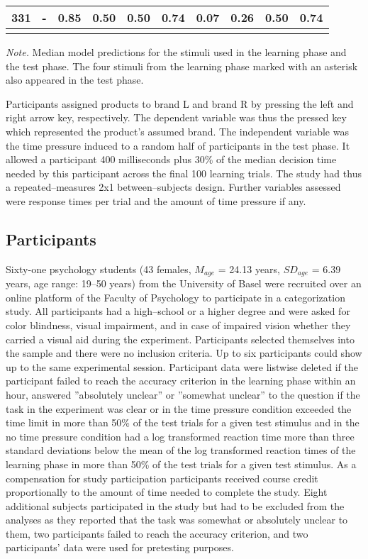 \documentclass[a4paper,man,natbib]{apa6}
\begin{document}
\begin{sidewaystable}
\begin{center}
\begin{threeparttable}
\begin{tabular}{cccccccccc}
331 & - & 0.85 & 0.50 & 0.50 & 0.74 & 0.07 & 0.26 & 0.50 & 0.74\\
\bottomrule
\addlinespace
\end{tabular}
\begin{tablenotes}[para]
\textit{Note.} Median model predictions for the stimuli used in the learning phase and the test phase. The four stimuli from the learning phase marked with an asterisk also appeared in the test phase.
\end{tablenotes}
\end{threeparttable}
\end{center}
\end{sidewaystable}

Participants assigned products to brand L and brand R by pressing the left and right arrow key, respectively. The dependent variable was thus the pressed key which represented the product's assumed brand. The independent variable was the time pressure induced to a random half of participants in the test phase. It allowed a participant 400 milliseconds plus 30\% of the median decision time needed by this participant across the final 100 learning trials. The study had thus a repeated--measures 2x1 between--subjects design. Further variables assessed were response times per trial and the amount of time pressure if any.

\subsection{Participants}
Sixty-one psychology students (43 females, $M_{age}$ = 24.13 years, $SD_{age}$ = 6.39 years, age range: 19--50 years) from the University of Basel were recruited over an online platform of the Faculty of Psychology to participate in a categorization study. All participants had a high--school or a higher degree and were asked for color blindness, visual impairment, and in case of impaired vision whether they carried a visual aid during the experiment. Participants selected themselves into the sample and there were no inclusion criteria. Up to six participants could show up to the same experimental session. Participant data were listwise deleted if the participant failed to reach the accuracy criterion in the learning phase within an hour, answered ''absolutely unclear'' or ''somewhat unclear'' to the question if the task in the experiment was clear or in the time pressure condition exceeded the time limit in more than 50\% of the test trials for a given test stimulus and in the no time pressure condition had a log transformed reaction time more than three standard deviations below the mean of the log transformed reaction times of the learning phase in more than 50\% of the test trials for a given test stimulus.  As a compensation for study participation participants received course credit proportionally to the amount of time needed to complete the study. Eight additional subjects participated in the study but had to be excluded from the analyses as they reported that the task was somewhat or absolutely unclear to them, two participants failed to reach the accuracy criterion, and two participants' data were used for pretesting purposes.
\end{document}
